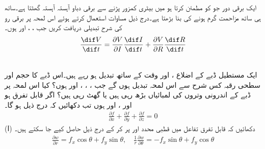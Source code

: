\\
\\
ایک برقی  دور جو  کو مطمئن  کرتا ہو میں  بیٹری کمزور پڑنے سے برقی دباو  آہستہ آہستہ  گھٹتا ہے۔ساتھ ہی ساتھ مزاحمت گرم ہونے کی بنا بڑھتا ہے۔درج ذیل مساوات استعمال کرتے ہوئے اس لمحہ پر برقی رو کی شرح تبدیلی دریافت کریں جب ، ،  اور  ہوں۔
\begin{align*}
\frac{\dif V}{\dif t}=\frac{\partial V}{\partial I}\frac{\dif I}{\dif t}+\frac{\partial V}{\partial R}\frac{\dif R}{\dif t}
\end{align*}
\begin{center}
\end{center}
\\
ایک مستطیل ڈبے کے اضلاع ،  اور   وقت کے ساتھ تبدیل ہو رہے ہیں۔اس ڈبے کا   حجم اور  سطحی رقبہ کس شرح سے اس لمحہ تبدیل ہوں  گے  جب ، ، ،  اور   ہوں؟ کیا اس لمحہ پر  ڈبے کے اندرونی  وتروں کی لمبائیاں بڑھ رہی ہیں یا گھٹ رہی ہیں؟
اگر  قابل تفرق ہو اور ،  اور  ہوں تب دکھائیں کہ درج ذیل ہو گا۔
\begin{align*}
\frac{\partial f}{\partial x}+\frac{\partial f}{\partial y}+\frac{\partial f}{\partial z}=0
\end{align*}
(ا) دکھائیں کہ قابل تفرق تفاعل  میں قطبی محدد  اور   پر کر کے درج ذیل حاصل کیے جا سکتے ہیں۔
\begin{align*}
\frac{\partial w}{\partial r}=f_x\cos\theta+f_y\sin\theta,\quad  \frac{1}{r}\frac{\partial w}{\partial \theta}=-f_x\sin\theta+f_y\cos\theta
\end{align*}
